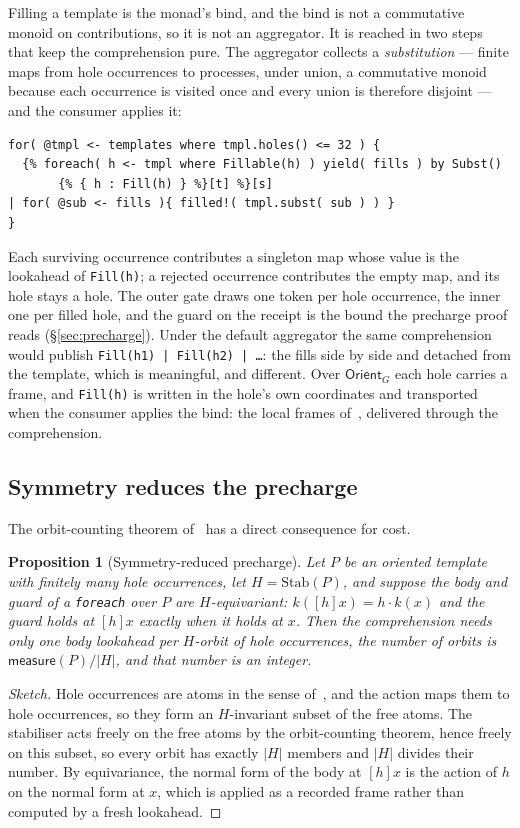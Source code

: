 \documentclass[11pt]{article}
\theoremstyle{definition}
\theoremstyle{plain}
\newtheorem{proposition}[definition]{Proposition}
\theoremstyle{remark}
\newcommand{\meas}{\mathsf{measure}}
\newcommand{\Stab}{\mathrm{Stab}}
\newcommand{\fe}{\texttt{foreach}}
\begin{document}
Filling a template is the monad's bind, and the bind is not a commutative
monoid on contributions, so it is not an aggregator. It is reached in two
steps that keep the comprehension pure. The aggregator collects a
\emph{substitution} --- finite maps from hole occurrences to processes, under
union, a commutative monoid because each occurrence is visited once and every
union is therefore disjoint --- and the consumer applies it:
\begin{lstlisting}
for( @tmpl <- templates where tmpl.holes() <= 32 ) {
  {% foreach( h <- tmpl where Fillable(h) ) yield( fills ) by Subst()
       {% { h : Fill(h) } %}[t] %}[s]
| for( @sub <- fills ){ filled!( tmpl.subst( sub ) ) }
}
\end{lstlisting}
Each surviving occurrence contributes a singleton map whose value is the
lookahead of \texttt{Fill(h)}; a rejected occurrence contributes the empty map,
and its hole stays a hole. The outer gate draws one token per hole occurrence,
the inner one per filled hole, and the guard on the receipt is the bound the
precharge proof reads (\S\ref{sec:precharge}). Under the default aggregator the
same comprehension would publish \texttt{Fill(h1) | Fill(h2) | \dots}: the fills
side by side and detached from the template, which is meaningful, and
different. Over \(\mathsf{Orient}_G\) each hole carries a frame, and
\texttt{Fill(h)} is written in the hole's own coordinates and transported when
the consumer applies the bind: the local frames of~\cite{Oriented}, delivered
through the comprehension.

\subsection{Symmetry reduces the precharge}

The orbit-counting theorem of~\cite{Oriented} has a direct consequence for cost.

\begin{proposition}[Symmetry-reduced precharge]
\label{prop:symprecharge}
Let \(P\) be an oriented template with finitely many hole occurrences, let
\(H=\Stab(P)\), and suppose the body and guard of a \fe{} over \(P\) are
\(H\)-equivariant: \(k([h]x) = h\cdot k(x)\) and the guard holds at \([h]x\)
exactly when it holds at \(x\). Then the comprehension needs only one body
lookahead per \(H\)-orbit of hole occurrences, the number of orbits is
\(\meas(P)/|H|\), and that number is an integer.
\end{proposition}

\begin{proof}[Sketch]
Hole occurrences are atoms in the sense of~\cite{Oriented}, and the action maps
them to hole occurrences, so they form an \(H\)-invariant subset of the free
atoms. The stabiliser acts freely on the free atoms by the orbit-counting
theorem, hence freely on this subset, so every orbit has exactly \(|H|\)
members and \(|H|\) divides their number. By equivariance, the normal form of
the body at \([h]x\) is the action of \(h\) on the normal form at \(x\), which is
applied as a recorded frame rather than computed by a fresh lookahead.
\end{proof}
\end{document}
